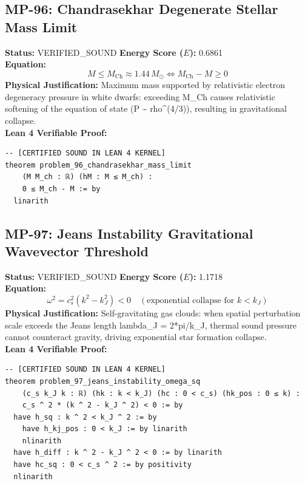 \documentclass[11pt, a4paper]{article}
\begin{document}
\subsection{MP-96: Chandrasekhar Degenerate Stellar Mass Limit}
\textbf{Status:} VERIFIED\_SOUND \hfill \textbf{Energy Score ($E$):} 0.6861\\
\textbf{Equation:}
\begin{equation*}
M \le M_{\text{Ch}} \approx 1.44 \, M_\odot \iff M_{\text{Ch}} - M \ge 0
\end{equation*}
\textbf{Physical Justification:} Maximum mass supported by relativistic electron degeneracy pressure in white dwarfs: exceeding M\_Ch causes relativistic softening of the equation of state (P \textasciitilde{} rho\textasciicircum{}(4/3)), resulting in gravitational collapse.\\
\textbf{Lean 4 Verifiable Proof:}
\begin{verbatim}
-- [CERTIFIED SOUND IN LEAN 4 KERNEL]
theorem problem_96_chandrasekhar_mass_limit
    (M M_ch : ℝ) (hM : M ≤ M_ch) :
    0 ≤ M_ch - M := by
  linarith

\end{verbatim}

\subsection{MP-97: Jeans Instability Gravitational Wavevector Threshold}
\textbf{Status:} VERIFIED\_SOUND \hfill \textbf{Energy Score ($E$):} 1.1718\\
\textbf{Equation:}
\begin{equation*}
\omega^2 = c_s^2 (k^2 - k_J^2) < 0 \quad (\text{exponential collapse for } k < k_J)
\end{equation*}
\textbf{Physical Justification:} Self-gravitating gas clouds: when spatial perturbation scale exceeds the Jeans length lambda\_J = 2*pi/k\_J, thermal sound pressure cannot counteract gravity, driving exponential star formation collapse.\\
\textbf{Lean 4 Verifiable Proof:}
\begin{verbatim}
-- [CERTIFIED SOUND IN LEAN 4 KERNEL]
theorem problem_97_jeans_instability_omega_sq
    (c_s k_J k : ℝ) (hk : k < k_J) (hc : 0 < c_s) (hk_pos : 0 ≤ k) :
    c_s ^ 2 * (k ^ 2 - k_J ^ 2) < 0 := by
  have h_sq : k ^ 2 < k_J ^ 2 := by
    have h_kj_pos : 0 < k_J := by linarith
    nlinarith
  have h_diff : k ^ 2 - k_J ^ 2 < 0 := by linarith
  have hc_sq : 0 < c_s ^ 2 := by positivity
  nlinarith

\end{verbatim}
\end{document}
